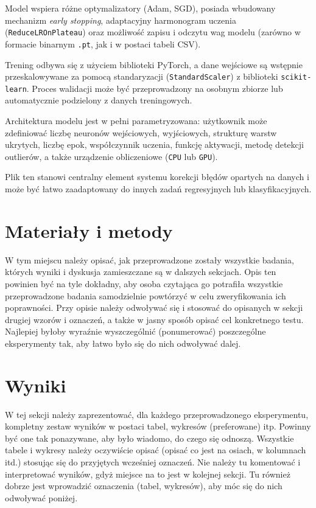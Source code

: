 \documentclass{classrep}
\begin{document}
Model wspiera różne optymalizatory (Adam, SGD), posiada wbudowany mechanizm \textit{early stopping}, adaptacyjny harmonogram uczenia (\texttt{ReduceLROnPlateau}) oraz możliwość zapisu i odczytu wag modelu (zarówno w formacie binarnym \texttt{.pt}, jak i w postaci tabeli CSV).

Trening odbywa się z użyciem biblioteki PyTorch, a dane wejściowe są wstępnie przeskalowywane za pomocą standaryzacji (\texttt{StandardScaler}) z biblioteki \texttt{scikit-learn}. Proces walidacji może być przeprowadzony na osobnym zbiorze lub automatycznie podzielony z danych treningowych.

Architektura modelu jest w pełni parametryzowana: użytkownik może zdefiniować liczbę neuronów wejściowych, wyjściowych, strukturę warstw ukrytych, liczbę epok, współczynnik uczenia, funkcję aktywacji, metodę detekcji outlierów, a także urządzenie obliczeniowe (\texttt{CPU} lub \texttt{GPU}).

Plik ten stanowi centralny element systemu korekcji błędów opartych na danych i może być łatwo zaadaptowany do innych zadań regresyjnych lub klasyfikacyjnych.

\section{Materiały i metody}
 {\color{blue}
  W tym miejscu należy opisać, jak przeprowadzone zostały wszystkie badania,
  których wyniki i dyskusja zamieszczane są w dalszych sekcjach. Opis ten
  powinien być na tyle dokładny, aby osoba czytająca go potrafiła wszystkie
  przeprowadzone badania samodzielnie powtórzyć w celu zweryfikowania ich
  poprawności. Przy opisie należy odwoływać się i stosować do
  opisanych w sekcji drugiej wzorów i oznaczeń, a także w jasny sposób opisać
  cel konkretnego testu. Najlepiej byłoby wyraźnie wyszczególnić (ponumerować)
  poszczególne eksperymenty tak, aby łatwo było się do nich odwoływać dalej.}

\section{Wyniki}
 {\color{blue}
  W tej sekcji należy zaprezentować, dla każdego przeprowadzonego eksperymentu,
  kompletny zestaw wyników w postaci tabel, wykresów (preferowane) itp. Powinny
  być one tak ponazywane, aby było wiadomo, do czego się odnoszą. Wszystkie
  tabele i wykresy należy oczywiście opisać (opisać co jest na osiach, w
  kolumnach itd.) stosując się do przyjętych wcześniej oznaczeń. Nie należy tu
  komentować i interpretować wyników, gdyż miejsce na to jest w kolejnej sekcji.
  Tu również dobrze jest wprowadzić oznaczenia (tabel, wykresów), aby móc się do
  nich odwoływać poniżej.}
\end{document}
